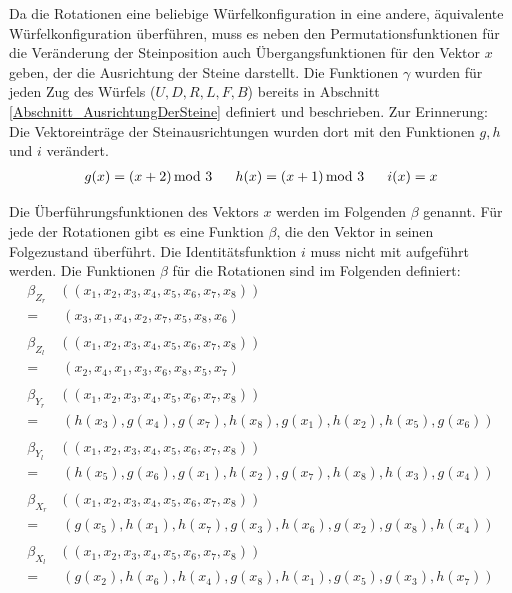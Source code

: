 \documentclass[12pt,a4paper, usenames, dvipsnames]{article}
\theoremstyle{mystyle}
\theoremstyle{definition}
\begin{document}
Da die Rotationen eine beliebige Würfel\-konfiguration in eine andere, äquivalente Würfel\-konfiguration überführen, muss es neben den Permutationsfunktionen für die Veränderung der Steinposition auch Übergangsfunktionen für den Vektor $x$ geben, der die Ausrichtung der Steine darstellt. Die Funktionen $\gamma$ wurden für jeden Zug des Würfels ($U, D, R, L, F, B$) bereits in Abschnitt \ref{Abschnitt_AusrichtungDerSteine} definiert und beschrieben. Zur Erinnerung: Die Vektoreinträge der Steinausrichtungen wurden dort mit den Funktionen $g, h$ und $i$ verändert.
\begin{align*}
g(x)=(x + 2) \hspace*{-0.5em} \mod 3 \ \ \ \ \ h(x) = (x+1) \hspace*{-0.5em} \mod 3 \ \ \ \ \ i(x)=x
\end{align*}

Die Überführungsfunktionen des Vektors $x$ werden im Folgenden $\beta$ genannt. Für jede der Rotationen gibt es eine Funktion $\beta$, die den Vektor in seinen Folgezustand überführt. Die Identitätsfunktion $i$ muss nicht mit aufgeführt werden. Die Funktionen $\beta$ für die Rotationen sind im Folgenden definiert:
\begin{align*}
\beta_{Z_r}  & \left( (x_1, x_2, x_3, x_4, x_5,x_6,x_7,x_8) \right)  \\
=  & \ (x_3, x_1, x_4, x_2, x_7, x_5, x_8, x_6) \\
\\
\beta_{Z_l}  &   \left( (x_1, x_2, x_3, x_4, x_5,x_6,x_7,x_8) \right)  \\
=  &  \ (x_2, x_4, x_1, x_3, x_6, x_8, x_5, x_7) \\
\\
\beta_{Y_r}  &  \left( (x_1, x_2, x_3, x_4, x_5,x_6,x_7,x_8)  \right) \\
=  & \ (h(x_3), g(x_4), g(x_7), h(x_8), g(x_1), h(x_2), h(x_5), g(x_6)) \\
\\
\beta_{Y_l}  &   \left( (x_1, x_2, x_3, x_4, x_5,x_6,x_7,x_8) \right)  \\
=  & \ (h(x_5), g(x_6), g(x_1), h(x_2),g(x_7),h(x_8),h(x_3),g(x_4)) \\
\\
\beta_{X_r}  &  \left( (x_1, x_2, x_3, x_4, x_5,x_6,x_7,x_8)  \right) \\
=  & \ (g(x_5), h(x_1), h(x_7), g(x_3), h(x_6), g(x_2), g(x_8),h(x_4)) \\
\\
\beta_{X_l}  &  \left( (x_1, x_2, x_3, x_4, x_5,x_6,x_7,x_8) \right)  \\
=  & \ (g(x_2), h(x_6), h(x_4),g(x_8), h(x_1), g(x_5), g(x_3), h(x_7)) 
\end{align*}
\end{document}
